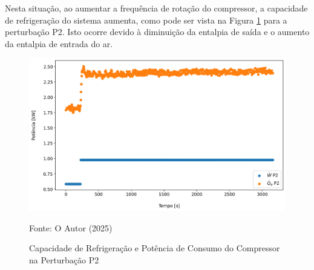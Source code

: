 Nesta situação, ao aumentar a frequência de rotação do compressor, a capacidade de refrigeração do sistema aumenta, como pode ser vista na Figura \ref{fig:Capacidade de Resfriamento e Potência de Consumo do Compressor P2} para a perturbação P2. Isto ocorre devido à diminuição da entalpia de saída e o aumento da entalpia de entrada do ar.
\newpage
\begin{figure}[h]
    \centering
    \includegraphics[width=1\linewidth]{FigurasdoTexto/Qe e W Perturbação Rot.png}
    \caption{Capacidade de Refrigeração e Potência de Consumo do Compressor na Perturbação P2}
    \label{fig:Capacidade de Resfriamento e Potência de Consumo do Compressor P2}
    {\footnotesize Fonte: O Autor (2025)}
\end{figure}

